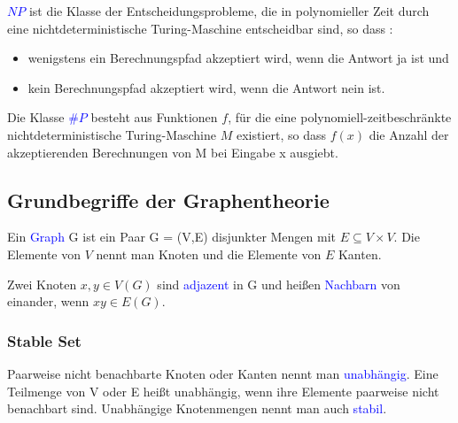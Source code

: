 \begin{definition}
\textcolor{blue}{$NP$} ist die Klasse der Entscheidungsprobleme, die in polynomieller Zeit durch eine nichtdeterministische Turing-Maschine entscheidbar sind, so dass \citep{Kompl1} :
\begin{itemize}
\item wenigstens ein Berechnungspfad akzeptiert wird, wenn die Antwort \glqq ja\grqq{}  ist und
\item kein Berechnungspfad akzeptiert wird, wenn die Antwort \glqq nein\grqq{} ist.
\end{itemize} 
\end{definition}

\begin{definition}
Die Klasse \textcolor{blue}{$\#P$} besteht aus Funktionen $f$, für die eine polynomiell-zeitbeschränkte nichtdeterministische Turing-Maschine $M$ existiert, so dass $f(x)$ die Anzahl der akzeptierenden Berechnungen von M bei Eingabe x ausgiebt. \citep{Kompl2}
\end{definition}


\subsection{Grundbegriffe der Graphentheorie} 

\begin{definition}
Ein \textcolor{blue}{Graph} G ist ein Paar G = (V,E) disjunkter Mengen mit $E \subseteq V\times V$. Die Elemente von $V$ nennt man Knoten und die Elemente von $E$ Kanten. \cite{Diestel}
\end{definition}

\begin{definition}
Zwei Knoten $x,y \in V(G)$ sind \textcolor{blue}{adjazent} in G und heißen \textcolor{blue}{Nachbarn} von einander, wenn $xy \in E(G)$. \cite{Diestel}
\end{definition}

\subsubsection*{Stable Set}

\begin{definition}
Paarweise nicht benachbarte Knoten oder Kanten nennt man \textcolor{blue}{unabhängig}. Eine Teilmenge von V oder E heißt unabhängig, wenn ihre Elemente paarweise nicht benachbart sind. Unabhängige Knotenmengen nennt man auch \textcolor{blue}{stabil}. \cite{Diestel}
\end{definition}

